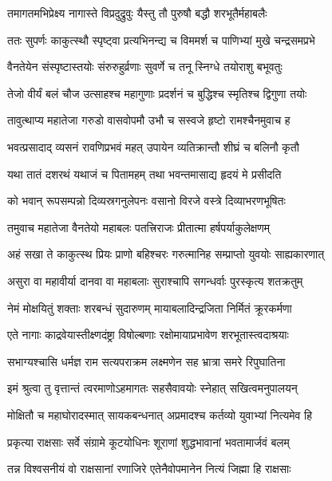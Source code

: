 \twolineshloka
{तमागतमभिप्रेक्ष्य नागास्ते विप्रदुद्रुवुः}
{यैस्तु तौ पुरुषौ बद्धौ शरभूतैर्महाबलैः} %

\twolineshloka
{ततः सुपर्णः काकुत्स्थौ स्पृष्ट्वा प्रत्यभिनन्द्य च}
{विममर्श च पाणिभ्यां मुखे चन्द्रसमप्रभे} %

\twolineshloka
{वैनतेयेन संस्पृष्टास्तयोः संरुरुहुर्व्रणाः}
{सुवर्णे च तनू स्निग्धे तयोराशु बभूवतुः} %

\twolineshloka
{तेजो वीर्यं बलं चौज उत्साहश्च महागुणाः}
{प्रदर्शनं च बुद्धिश्च स्मृतिश्च द्विगुणा तयोः} %

\twolineshloka
{तावुत्थाप्य महातेजा गरुडो वासवोपमौ}
{उभौ च सस्वजे हृष्टो रामश्चैनमुवाच ह} %

\twolineshloka
{भवत्प्रसादाद् व्यसनं रावणिप्रभवं महत्}
{उपायेन व्यतिक्रान्तौ शीघ्रं च बलिनौ कृतौ} %

\twolineshloka
{यथा तातं दशरथं यथाजं च पितामहम्}
{तथा भवन्तमासाद्य हृदयं मे प्रसीदति} %

\twolineshloka
{को भवान् रूपसम्पन्नो दिव्यस्रगनुलेपनः}
{वसानो विरजे वस्त्रे दिव्याभरणभूषितः} %

\twolineshloka
{तमुवाच महातेजा वैनतेयो महाबलः}
{पतत्त्रिराजः प्रीतात्मा हर्षपर्याकुलेक्षणम्} %

\twolineshloka
{अहं सखा ते काकुत्स्थ प्रियः प्राणो बहिश्चरः}
{गरुत्मानिह सम्प्राप्तो युवयोः साह्यकारणात्} %

\twolineshloka
{असुरा वा महावीर्या दानवा वा महाबलाः}
{सुराश्चापि सगन्धर्वाः पुरस्कृत्य शतक्रतुम्} %

\twolineshloka
{नेमं मोक्षयितुं शक्ताः शरबन्धं सुदारुणम्}
{मायाबलादिन्द्रजिता निर्मितं क्रूरकर्मणा} %

\twolineshloka
{एते नागाः काद्रवेयास्तीक्ष्णदंष्ट्रा विषोल्बणाः}
{रक्षोमायाप्रभावेण शरभूतास्त्वदाश्रयाः} %

\twolineshloka
{सभाग्यश्चासि धर्मज्ञ राम सत्यपराक्रम}
{लक्ष्मणेन सह भ्रात्रा समरे रिपुघातिना} %

\twolineshloka
{इमं श्रुत्वा तु वृत्तान्तं त्वरमाणोऽहमागतः}
{सहसैवावयोः स्नेहात् सखित्वमनुपालयन्} %

\twolineshloka
{मोक्षितौ च महाघोरादस्मात् सायकबन्धनात्}
{अप्रमादश्च कर्तव्यो युवाभ्यां नित्यमेव हि} %

\twolineshloka
{प्रकृत्या राक्षसाः सर्वे संग्रामे कूटयोधिनः}
{शूराणां शुद्धभावानां भवतामार्जवं बलम्} %

\twolineshloka
{तन्न विश्वसनीयं वो राक्षसानां रणाजिरे}
{एतेनैवोपमानेन नित्यं जिह्मा हि राक्षसाः} %

